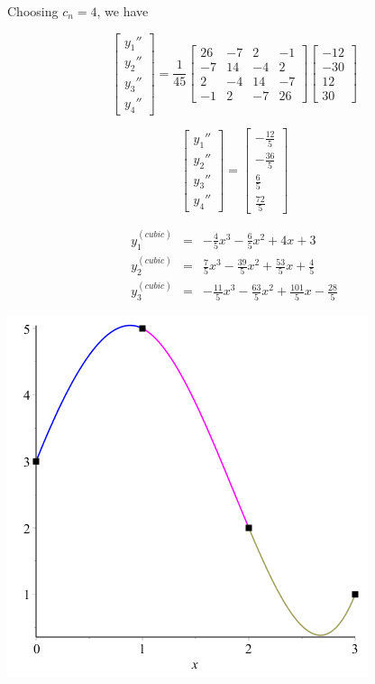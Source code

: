 \documentclass[11pt]{article} %
\begin{document}
Choosing $c_n = 4$, we have

$$
\begin{bmatrix} y_1'' \\ y_2'' \\ y_3'' \\ y_4'' \end{bmatrix} = 
\frac{1}{45}\begin{bmatrix}26 & -7 & 2 & -1 \\ -7 & 14 & -4 & 2 
		 \\  2 & -4 & 14 & -7 \\ -1 & 2 & -7 & 26
\end{bmatrix}
\begin{bmatrix} -12 \\ -30 \\ 12 \\ 30\end{bmatrix}$$

$$
\begin{bmatrix} y_1'' \\ y_2'' \\ y_3'' \\ y_4'' \end{bmatrix} = 
\begin{bmatrix} -\frac{12}{5} \\ -\frac{36}{5} \\\frac{6}{5} \\ \frac{72}{5}\end{bmatrix}$$

$$\begin{array}{lclcl} y^{(cubic)}_1 & = & -\frac{4}{5}x^3 - \frac{6}{5}x^2 + 4x + 3  \\
		        y^{(cubic)}_2  & = & \frac{7}{5}x^3 - \frac{39}{5}x^2 + \frac{53}{5}x + \frac{4}{5} \\
		        y^{(cubic)}_3  & = & -\frac{11}{5}x^3 - \frac{63}{5}x^2 + \frac{101}{5}x - \frac{28}{5} 
\end{array}$$

\begin{center}
\includegraphics[scale=.5]{plots/problem4plot3.png}
\end{center}
\end{document}
